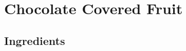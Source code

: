 \thispagestyle{fancy}
\section{Chocolate Covered Fruit}
\AddToShipoutPicture*{\Strawberries}

\subsection*{Ingredients}
